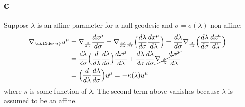 \documentclass{article}
\begin{document}
\subsection*{c}
Suppose $\lambda$ is an affine parameter for a null-geodesic and $\sigma = \sigma(\lambda)$ non-affine:
\begin{align*}
 \nabla_{\utilde{u}}u^\mu &= \nabla_{\frac{d}{d\sigma}}\frac{dx^\mu}{d\sigma} 
	= \nabla_{\frac{d\lambda}{d\sigma}\frac{d}{d\lambda}}\Big(\frac{d\lambda}{d\sigma}\frac{dx^\mu}{d\lambda}\Big)
	= \frac{d\lambda}{d\sigma} \nabla_{\frac{d}{d\lambda}}\Big(\frac{d\lambda}{d\sigma}\frac{dx^\mu}{d\lambda}\Big) \\
	&= \frac{d\lambda}{d\sigma} \Big(\frac{d}{d\lambda}\frac{d\lambda}{d\sigma} \Big)\frac{dx^\mu}{d\lambda}
	+ \frac{d\lambda}{d\sigma}\frac{d\lambda}{d\sigma} \cancel{\nabla_{\frac{d}{d\lambda}}\frac{dx^\mu}{d\lambda}} \\
	&= \Big(\frac{d}{d\lambda}\frac{d\lambda}{d\sigma}\Big) u^\mu = - \kappa(\lambda) u^\mu
\end{align*}
where $\kappa$ is some function of $\lambda$. The second term above vanishes because $\lambda$ is assumed to be an affine.
\end{document}

